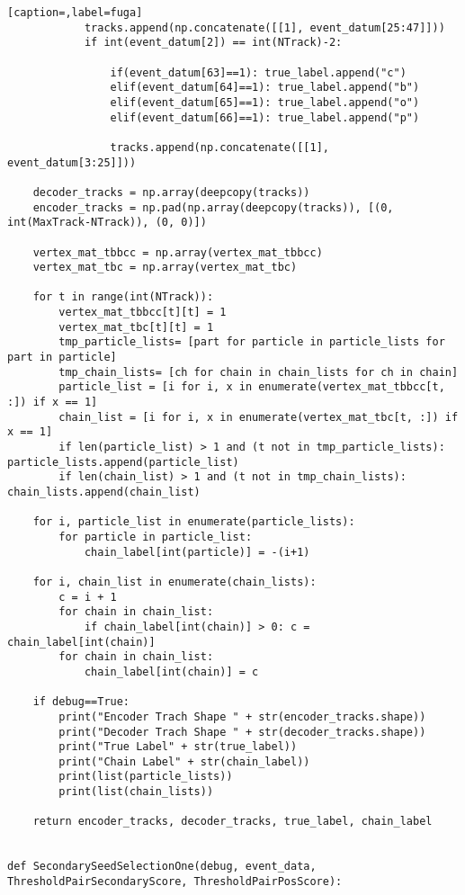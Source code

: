 \begin{lstlisting}[caption=,label=fuga]
            tracks.append(np.concatenate([[1], event_datum[25:47]]))
            if int(event_datum[2]) == int(NTrack)-2:
             
                if(event_datum[63]==1): true_label.append("c")
                elif(event_datum[64]==1): true_label.append("b")
                elif(event_datum[65]==1): true_label.append("o")
                elif(event_datum[66]==1): true_label.append("p")
            
                tracks.append(np.concatenate([[1], event_datum[3:25]]))

    decoder_tracks = np.array(deepcopy(tracks))
    encoder_tracks = np.pad(np.array(deepcopy(tracks)), [(0, int(MaxTrack-NTrack)), (0, 0)])

    vertex_mat_tbbcc = np.array(vertex_mat_tbbcc)
    vertex_mat_tbc = np.array(vertex_mat_tbc)

    for t in range(int(NTrack)):
        vertex_mat_tbbcc[t][t] = 1
        vertex_mat_tbc[t][t] = 1
        tmp_particle_lists= [part for particle in particle_lists for part in particle]
        tmp_chain_lists= [ch for chain in chain_lists for ch in chain]
        particle_list = [i for i, x in enumerate(vertex_mat_tbbcc[t, :]) if x == 1]
        chain_list = [i for i, x in enumerate(vertex_mat_tbc[t, :]) if x == 1]
        if len(particle_list) > 1 and (t not in tmp_particle_lists): particle_lists.append(particle_list)
        if len(chain_list) > 1 and (t not in tmp_chain_lists): chain_lists.append(chain_list)

    for i, particle_list in enumerate(particle_lists):
        for particle in particle_list:
            chain_label[int(particle)] = -(i+1)
    
    for i, chain_list in enumerate(chain_lists):
        c = i + 1
        for chain in chain_list:
            if chain_label[int(chain)] > 0: c = chain_label[int(chain)]
        for chain in chain_list:
            chain_label[int(chain)] = c

    if debug==True: 
        print("Encoder Trach Shape " + str(encoder_tracks.shape))
        print("Decoder Trach Shape " + str(decoder_tracks.shape))
        print("True Label" + str(true_label))
        print("Chain Label" + str(chain_label))
        print(list(particle_lists))
        print(list(chain_lists))

    return encoder_tracks, decoder_tracks, true_label, chain_label


def SecondarySeedSelectionOne(debug, event_data, ThresholdPairSecondaryScore, ThresholdPairPosScore):


\end{lstlisting}
